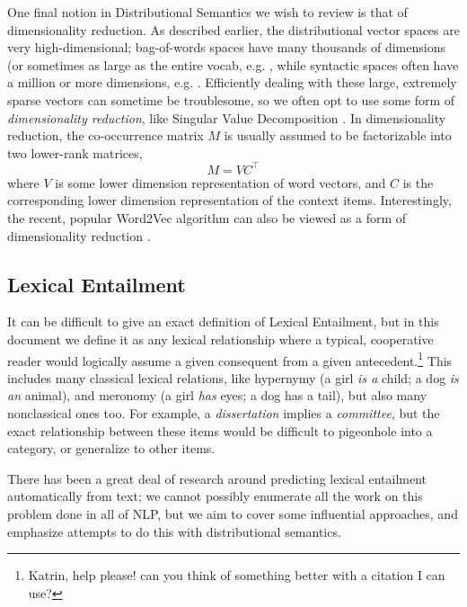 \documentclass[letterpaper]{article}
\begin{document}
One final notion in Distributional Semantics we wish to review is that of
dimensionality reduction. As described earlier, the distributional vector
spaces are very high-dimensional; bag-of-words spaces have many thousands of
dimensions (or sometimes as large as the entire vocab, e.g.
, while syntactic spaces often have a million
or more dimensions, e.g. . Efficiently dealing
with these large, extremely sparse vectors can sometime be troublesome, so
we often opt to use some form of {\em dimensionality reduction}, like
Singular Value Decomposition \cite{landauer:1997:pr}. In dimensionality
reduction, the co-occurrence matrix $M$ is usually assumed to be factorizable
into two lower-rank matrices,
\begin{equation*}
  M = VC^{\top}
\end{equation*}
where $V$ is some lower dimension representation of word vectors, and $C$
is the corresponding lower dimension representation of the context items.
Interestingly, the recent, popular Word2Vec algorithm \cite{mikolov:2013:iclr}
can also be viewed as a form of dimensionality reduction \cite{levy:2014:nips}.

\subsection{Lexical Entailment}

It can be difficult to give an exact definition of Lexical Entailment, but in
this document we define it as any lexical relationship where a typical,
cooperative reader would logically assume a given consequent from a given
antecedent.\footnote{Katrin, help please!  can you think of something better
with a citation I can use?} This includes many classical lexical relations,
like hypernymy (a girl {\em is a} child; a dog {\em is an} animal), and
meronomy (a girl {\em has} eyes; a dog {has a} tail), but also many
nonclassical ones too. For example, a {\em dissertation} implies a {\em
committee}, but the exact relationship between these items would be difficult
to pigeonhole into a category, or generalize to other items.

There has been a great deal of research around predicting lexical entailment
automatically from text; we cannot possibly enumerate all the work on this
problem done in all of NLP, but we aim to cover some influential approaches,
and emphasize attempts to do this with distributional semantics.
\end{document}
